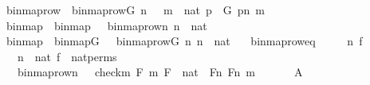 \begin{isabellebody}
\isamarkupfalse%
\ binmap{\isacharunderscore}{\kern0pt}row\ \ {\isachardoublequoteopen}binmap{\isacharunderscore}{\kern0pt}row{\isacharparenleft}{\kern0pt}G{\isacharcomma}{\kern0pt}\ n{\isacharparenright}{\kern0pt}\ {\isasymequiv}\ {\isacharbraceleft}{\kern0pt}\ m\ {\isasymin}\ nat{\isachardot}{\kern0pt}\ {\isasymexists}p\ {\isasymin}\ G{\isachardot}{\kern0pt}\ p{\isacharbackquote}{\kern0pt}{\isacharless}{\kern0pt}n{\isacharcomma}{\kern0pt}\ m{\isachargreater}{\kern0pt}\ {\isacharequal}{\kern0pt}\ {}\ {\isacharbraceright}{\kern0pt}{\isachardoublequoteclose}\ \isanewline
{}\isamarkupfalse%
\ binmap{\isacharprime}{\kern0pt}\ \ {\isachardoublequoteopen}binmap{\isacharprime}{\kern0pt}\ {\isasymequiv}\ {\isacharbraceleft}{\kern0pt}\ binmap{\isacharunderscore}{\kern0pt}row{\isacharprime}{\kern0pt}{\isacharparenleft}{\kern0pt}n{\isacharparenright}{\kern0pt}{\isachardot}{\kern0pt}\ n\ {\isasymin}\ nat\ {\isacharbraceright}{\kern0pt}\ {\isasymtimes}\ {\isacharbraceleft}{\kern0pt}\ {}\ {\isacharbraceright}{\kern0pt}{\isachardoublequoteclose}\ \isanewline
{}\isamarkupfalse%
\ binmap\ \ {\isachardoublequoteopen}binmap{\isacharparenleft}{\kern0pt}G{\isacharparenright}{\kern0pt}\ {\isasymequiv}\ {\isacharbraceleft}{\kern0pt}\ binmap{\isacharunderscore}{\kern0pt}row{\isacharparenleft}{\kern0pt}G{\isacharcomma}{\kern0pt}\ n{\isacharparenright}{\kern0pt}{\isachardot}{\kern0pt}\ n\ {\isasymin}\ nat\ {\isacharbraceright}{\kern0pt}{\isachardoublequoteclose}\ \isanewline
\isanewline
\isanewline
{}\isamarkupfalse%
\ binmap{\isacharunderscore}{\kern0pt}row{\isacharprime}{\kern0pt}{\isacharunderscore}{\kern0pt}eq\ {\isacharcolon}{\kern0pt}\ \isanewline
\ \ \ n\ f\ \isanewline
\ \ \ {\isachardoublequoteopen}n\ {\isasymin}\ nat{\isachardoublequoteclose}\ {\isachardoublequoteopen}f\ {\isasymin}\ nat{\isacharunderscore}{\kern0pt}perms{\isachardoublequoteclose}\ \isanewline
\ \ \ {\isachardoublequoteopen}binmap{\isacharunderscore}{\kern0pt}row{\isacharprime}{\kern0pt}{\isacharparenleft}{\kern0pt}n{\isacharparenright}{\kern0pt}\ {\isacharequal}{\kern0pt}\ {\isacharbraceleft}{\kern0pt}\ {\isacharless}{\kern0pt}check{\isacharparenleft}{\kern0pt}m{\isacharparenright}{\kern0pt}{\isacharcomma}{\kern0pt}\ F{\isachargreater}{\kern0pt}{\isachardot}{\kern0pt}{\isachardot}{\kern0pt}\ {\isacharless}{\kern0pt}m{\isacharcomma}{\kern0pt}\ F{\isachargreater}{\kern0pt}\ {\isasymin}\ nat\ {\isasymtimes}\ Fn{\isacharcomma}{\kern0pt}\ F{\isacharbackquote}{\kern0pt}{\isacharless}{\kern0pt}n{\isacharcomma}{\kern0pt}\ m{\isachargreater}{\kern0pt}\ {\isacharequal}{\kern0pt}\ {}\ {\isacharbraceright}{\kern0pt}{\isachardoublequoteclose}\ {\isacharparenleft}{\kern0pt}\ {\isachardoublequoteopen}{\isacharunderscore}{\kern0pt}\ {\isacharequal}{\kern0pt}\ {\isacharquery}{\kern0pt}A{\isachardoublequoteclose}{\isacharparenright}{\kern0pt}\isanewline

\end{isabellebody}
